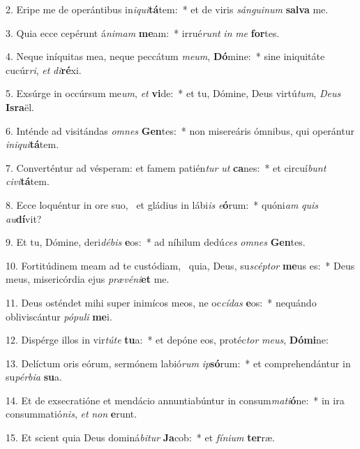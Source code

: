 2. Eripe me de operántibus in\textit{i}\textit{qui}\textbf{tá}tem:~*  et de viris \textit{sán}\textit{gui}\textit{num} \textbf{sal}\textbf{va} me.\

3. Quia ecce cepérunt á\textit{ni}\textit{mam} \textbf{me}am:~*  irrué\textit{runt} \textit{in} \textit{me} \textbf{for}tes.\

4. Neque iníquitas mea, neque peccátum \textit{me}\textit{um}, \textbf{Dó}mine:~*  sine iniquitáte cucúr\textit{ri}, \textit{et} \textit{di}\textbf{ré}xi.\

5. Exsúrge in occúrsum me\textit{um}, \textit{et} \textbf{vi}de:~*  et tu, Dómine, Deus virtú\textit{tum}, \textit{De}\textit{us} \textbf{Is}\textbf{ra}ël.\

6. Inténde ad visitándas \textit{om}\textit{nes} \textbf{Gen}tes:~*  non misereáris ómnibus, qui operántur \textit{in}\textit{i}\textit{qui}\textbf{tá}tem.\

7. Converténtur ad vésperam: et famem patién\textit{tur} \textit{ut} \textbf{ca}nes:~*  et circuí\textit{bunt} \textit{ci}\textit{vi}\textbf{tá}tem.\

8. Ecce loquéntur in ore suo, \dag\  et gládius in lábi\textit{is} \textit{e}\textbf{ó}rum:~*  quóni\textit{am} \textit{quis} \textit{au}\textbf{dí}vit?\

9. Et tu, Dómine, deri\textit{dé}\textit{bis} \textbf{e}os:~*  ad níhilum dedú\textit{ces} \textit{om}\textit{nes} \textbf{Gen}tes.\

10. Fortitúdinem meam ad te custódiam, \dag\  quia, Deus, su\textit{scép}\textit{tor} \textbf{me}us es:~*  Deus meus, misericórdia ejus \textit{præ}\textit{vé}\textit{ni}\textbf{et} me.\

11. Deus osténdet mihi super inimícos meos, ne oc\textit{cí}\textit{das} \textbf{e}os:~*  nequándo obliviscántur \textit{pó}\textit{pu}\textit{li} \textbf{me}i.\

12. Dispérge illos in vir\textit{tú}\textit{te} \textbf{tu}a:~*  et depóne eos, protéc\textit{tor} \textit{me}\textit{us}, \textbf{Dó}\textbf{mi}ne:\

13. Delíctum oris eórum, sermónem labió\textit{rum} \textit{ip}\textbf{só}rum:~*  et comprehendántur in su\textit{pér}\textit{bi}\textit{a} \textbf{su}a.\

14. Et de exsecratióne et mendácio annuntiabúntur in consum\textit{ma}\textit{ti}\textbf{ó}ne:~*  in ira consummatió\textit{nis}, \textit{et} \textit{non} \textbf{e}runt.\

15. Et scient quia Deus dominá\textit{bi}\textit{tur} \textbf{Ja}cob:~*  et \textit{fí}\textit{ni}\textit{um} \textbf{ter}ræ.\

